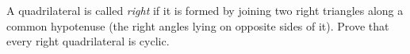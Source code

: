 A quadrilateral is called \emph{right} if it is formed by joining two right triangles along a common hypotenuse (the right angles lying on opposite sides of it). Prove that every right quadrilateral is cyclic.
